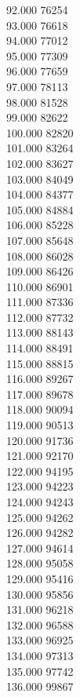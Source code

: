 { 92.000	76254 \\
 93.000	76618 \\
 94.000	77012 \\
 95.000	77309 \\
 96.000	77659 \\
 97.000	78113 \\
 98.000	81528 \\
 99.000	82622 \\
 100.000	82820 \\
 101.000	83264 \\
 102.000	83627 \\
 103.000	84049 \\
 104.000	84377 \\
 105.000	84884 \\
 106.000	85228 \\
 107.000	85648 \\
 108.000	86028 \\
 109.000	86426 \\
 110.000	86901 \\
 111.000	87336 \\
 112.000	87732 \\
 113.000	88143 \\
 114.000	88491 \\
 115.000	88815 \\
 116.000	89267 \\
 117.000	89678 \\
 118.000	90094 \\
 119.000	90513 \\
 120.000	91736 \\
 121.000	92170 \\
 122.000	94195 \\
 123.000	94223 \\
 124.000	94243 \\
 125.000	94262 \\
 126.000	94282 \\
 127.000	94614 \\
 128.000	95058 \\
 129.000	95416 \\
 130.000	95856 \\
 131.000	96218 \\
 132.000	96588 \\
 133.000	96925 \\
 134.000	97313 \\
 135.000	97742 \\
 136.000	99867 \\
}
